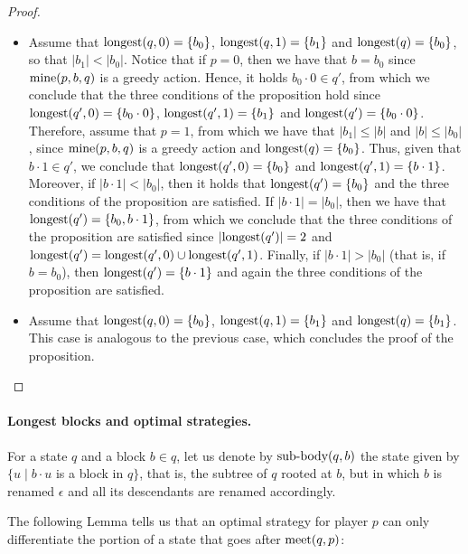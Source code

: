 \begin{proof}
\begin{itemize}
\item Assume that ${\text{\rm longest}}(q,0) = \{b_0\}$,  ${\text{\rm longest}}(q, 1) = \{b_1\}$ and ${\text{\rm longest}}(q) = \{b_0\}$, so that $|b_1| < |b_0|$. Notice that if $p =0$, then we have that $b=b_0$ since $\text{\rm mine}(p,b,q)$ is a greedy action. Hence, it holds $b_0 \cdot 0 \in q'$, from which we conclude that the three conditions of the proposition hold since ${\text{\rm longest}}(q',0) = \{b_0 \cdot 0\}$, ${\text{\rm longest}}(q',1) = \{b_1\}$ and ${\text{\rm longest}}(q') = \{b_0 \cdot 0\}$. Therefore, assume that $p = 1$, from which we have that  $|b_1| \leq |b|$ and $|b| \leq |b_0|$, since $\text{\rm mine}(p,b,q)$ is a greedy action and ${\text{\rm longest}}(q) = \{b_0\}$. Thus, given that $b \cdot 1 \in q'$, we conclude that ${\text{\rm longest}}(q',0) = \{b_0\}$ and ${\text{\rm longest}}(q',1) = \{b \cdot 1\}$. 
Moreover, if $|b \cdot 1| < |b_0|$, then it holds that ${\text{\rm longest}}(q') = \{b_0\}$ and the three conditions of the proposition are satisfied. If $|b \cdot 1| = |b_0|$, then we have that ${\text{\rm longest}}(q') = \{b_0, b \cdot 1\}$, from which we conclude that the three conditions of the proposition are satisfied since $|{\text{\rm longest}}(q')| = 2$ and ${\text{\rm longest}}(q') = {\text{\rm longest}}(q',0) \cup {\text{\rm longest}}(q',1)$. Finally, if $|b \cdot 1| > |b_0|$ (that is, if $b = b_0$), then ${\text{\rm longest}}(q') = \{b \cdot 1\}$ and again the three conditions of the proposition are satisfied.

\item Assume that ${\text{\rm longest}}(q,0) = \{b_0\}$,  ${\text{\rm longest}}(q, 1) = \{b_1\}$ and ${\text{\rm longest}}(q) = \{b_1\}$. This case is analogous to the previous case, which concludes the proof of the proposition.
\end{itemize}
\end{proof}

\paragraph{Longest blocks and optimal strategies.}
For a state $q$ and a block $b \in q$, let us denote by ${\text{\rm sub-body}}(q,b)$ the state
given by $\{u \mid b\cdot u$ is a block in $q\}$, that is, the subtree of $q$ rooted at $b$, but in which $b$ is renamed 
$\epsilon$ and all its descendants are renamed accordingly. 


The following Lemma tells us that an optimal strategy for player $p$ can only differentiate the portion of 
a state that goes after $\text{\rm meet}(q,p)$: 

